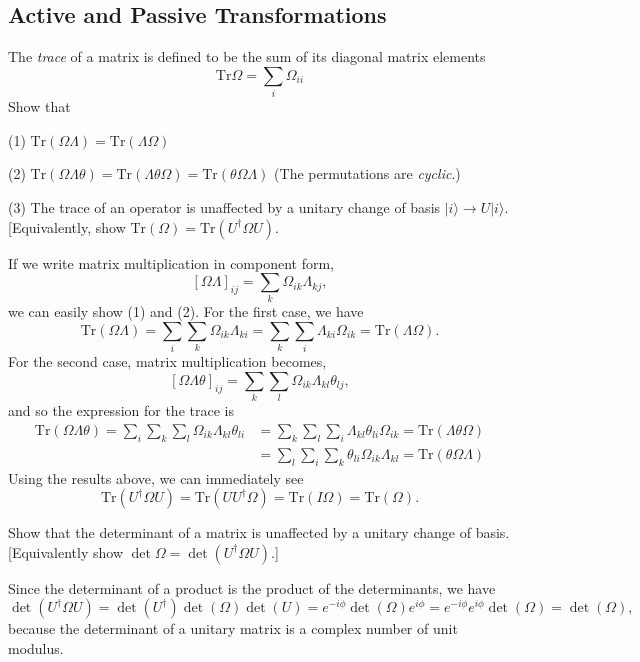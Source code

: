 \documentclass[../principles-of-quantum-mechanics.tex]{subfiles}
\begin{document}
\begin{questions}
\setcounter{subsection}{6}
\setcounter{question}{0}
\subsection{Active and Passive Transformations}
\question The \textit{trace} of a matrix is defined to be the sum of its diagonal matrix elements
$$\mathrm{Tr}\Omega = \sum_i\Omega_{ii}$$
Show that

(1) $\mathrm{Tr}(\Omega\Lambda) = \mathrm{Tr}(\Lambda\Omega)$

(2) $\mathrm{Tr}(\Omega\Lambda\theta) = \mathrm{Tr}(\Lambda\theta\Omega) = \mathrm{Tr}(\theta\Omega\Lambda)$ (The permutations are \textit{cyclic}.)

(3) The trace of an operator is unaffected by a unitary change of basis $|i\rangle \to U|i\rangle$. [Equivalently, show $\mathrm{Tr}(\Omega) = \mathrm{Tr}(U^\dagger\Omega{U})$.

\begin{solution}
	If we write matrix multiplication in component form,
	\[
		[\Omega\Lambda]_{ij} = \sum_{k}\Omega_{ik}\Lambda_{kj},
	\]
	we can easily show (1) and (2). For the first case, we have
	\[
		\mathrm{Tr}(\Omega\Lambda) = \sum_{i}\sum_{k}\Omega_{ik}\Lambda_{ki} = \sum_{k}\sum_{i}\Lambda_{ki}\Omega_{ik} = \mathrm{Tr}(\Lambda\Omega).
	\]
	For the second case, matrix multiplication becomes,
	\[
		[\Omega\Lambda\theta]_{ij} = \sum_k\sum_l\Omega_{ik}\Lambda_{kl}\theta_{lj},
	\]
	and so the expression for the trace is
	\begin{align*}
		\mathrm{Tr}(\Omega\Lambda\theta) = \sum_i\sum_k\sum_l\Omega_{ik}\Lambda_{kl}\theta_{li}
		&= \sum_k\sum_l\sum_i\Lambda_{kl}\theta_{li}\Omega_{ik} = \mathrm{Tr}(\Lambda\theta\Omega) \\
		&= \sum_l\sum_i\sum_k\theta_{li}\Omega_{ik}\Lambda_{kl} = \mathrm{Tr}(\theta\Omega\Lambda)
	\end{align*}
	Using the results above, we can immediately see
	\[
		\mathrm{Tr}(U^\dagger\Omega{U}) = \mathrm{Tr}(UU^\dagger\Omega) = \mathrm{Tr}(I\Omega) = \mathrm{Tr}(\Omega).
	\]
\end{solution}

\question Show that the determinant of a matrix is unaffected by a unitary change of basis. [Equivalently show $\det\Omega = \det(U^\dagger\Omega{U})$.]

\begin{solution}
	Since the determinant of a product is the product of the determinants, we have
	\[
		\det(U^\dagger\Omega{U}) = \det({U^\dagger})\det(\Omega)\det({U}) = e^{-i\phi}\det(\Omega){e^{i\phi}} = e^{-i\phi}e^{i\phi}\det(\Omega) = \det(\Omega),
	\]
	because the determinant of a unitary matrix is a complex number of unit modulus.
\end{solution}


\end{questions}
\end{document}

